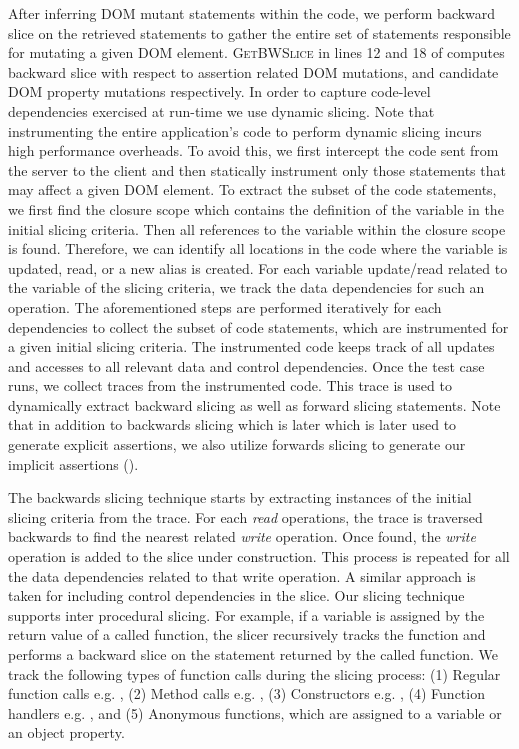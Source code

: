 After inferring DOM mutant statements within the code, we perform backward slice on the retrieved statements to gather the entire set of \javascript statements responsible for mutating a given DOM element. \textsc{GetBWSlice} in lines 
12 and 18 of  computes backward slice with respect to assertion related DOM mutations, and candidate DOM property mutations respectively.
In order to capture code-level dependencies exercised at run-time we use dynamic slicing. 
Note that instrumenting the entire application's code to perform dynamic slicing incurs high performance overheads. To avoid this, we first intercept the code sent from the server to the client and then statically instrument only those statements that may affect a given DOM element.
To extract the subset of the code statements, we first find the \javascript closure scope which contains the definition of the variable in the initial slicing criteria. Then all references to the variable within the closure scope is found. Therefore, we can identify all locations in the code where the variable is updated, read, or a new alias is created. For each variable update/read related to the variable of the slicing criteria, we track the data dependencies for such an operation. The aforementioned steps are performed iteratively for each dependencies to collect the subset of code statements, which are instrumented for a given initial slicing criteria.
The instrumented code keeps track of all updates and accesses to all relevant data and control dependencies.   
Once the test case runs, we collect traces from the instrumented code. This trace is used to dynamically extract backward slicing as well as forward slicing statements. Note that in addition to backwards slicing which is later which is later used to generate explicit assertions, we also utilize forwards slicing to generate our implicit assertions ().  

The backwards slicing technique starts by extracting instances of the initial slicing criteria from the trace. For each \textit{read} operations, the trace is traversed backwards to find the nearest related \textit{write} operation. Once found, the \textit{write} operation is added to the slice under construction. This process is repeated for all the data dependencies related to that write operation. A similar approach is taken for including control dependencies in the slice. 
Our slicing technique supports inter procedural slicing. For example, if a variable is assigned by the return value of a called function, the slicer recursively tracks the function and performs a backward slice on the statement returned by the called function.
We track the following types of function calls during the slicing process: (1) Regular function calls e.g. , (2) Method calls e.g. ,
(3) Constructors e.g. , (4) Function handlers e.g. , 
and (5) Anonymous functions, which are assigned to a variable or an object property.
  
